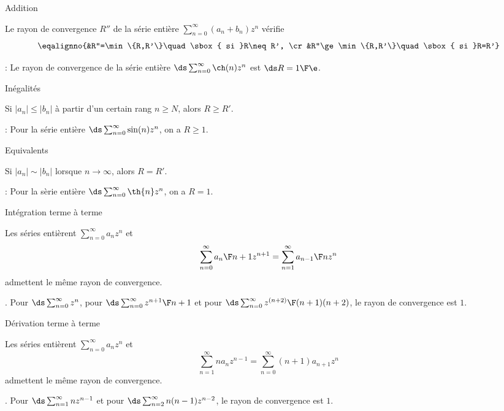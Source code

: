 \Concept [Index=Rayon de convergence!Addition] Addition

\Propriete [$R$ et $R'$ rayons de convergences de $\sum_{n=0}^\infty a_nz^n$ et $\sum_{n=0}^\infty b_nz^n$]
Le rayon de convergence $R''$ de la série entière $\sum_{n=0}^\infty(a_n+b_n)z^n$ vérifie 
$$
\eqalignno{&R''=\min\{R,R'\}\quad\sbox{ si }R\neq R', \cr
&R''\ge\min\{R,R'\}\quad\sbox{ si }R=R'} 
$$

\Application : Le rayon de convergence de la série entière $\ds\sum_{n=0}^\infty\ch(n)z^n$ est $\ds R={1\F\e}$. 

\Concept [Index=Rayon de convergence!Inegalites@Inégalités] Inégalités

\Propriete [$R$ et $R'$ rayons de convergences de $\sum_{n=0}^\infty a_nz^n$ et $\sum_{n=0}^\infty b_nz^n$]
Si $|a_n|\le |b_n|$ à partir d'un certain rang $n\ge N$, alors $R\ge R'$. 

\Application : Pour la série entière $\ds\sum_{n=0}^\infty\sin(n) z^n$, on a $R\ge 1$. 

\Concept [Index=Rayon de convergence!Equivalents] Equivalents

\Propriete [$R$ et $R'$ rayons de convergences de $\sum_{n=0}^\infty a_nz^n$ et $\sum_{n=0}^\infty b_nz^n$]
Si $|a_n|\sim|b_n|$ lorsque $n\to\infty$, alors $R=R'$. 

\Application : Pour la sèrie entière $\ds\sum_{n=0}^\infty\th{n}z^n$, on a $R=1$. 

\Concept [Index=Rayon de convergence!Integration terme a terme] Intégration terme à terme

Les séries entièrent $\sum_{n=0}^\infty a_nz^n$ et 
$$
\sum\limits_{n=0}^\infty {a_n\F n+1}z^{n+1}=\sum_{n=1}^\infty{a_{n-1}\F n}z^n
$$
admettent le même rayon de convergence. 

\Exemple. Pour $\ds\sum_{n=0}^\infty z^n$, pour $\ds\sum_{n=0}^\infty{z^{n+1}\F n+1}$ et pour 
$\ds\sum_{n=0}^\infty{z^{(n+2)}\F (n+1)(n+2)}$, le rayon de convergence est $1$. 

\Concept [Index=Rayon de convergence!Derivation terme a terme@Dérivation terme à terme] Dérivation terme à terme

Les séries entièrent $\sum_{n=0}^\infty a_nz^n$ et 
$$
\sum\limits_{n=1}^\infty na_nz^{n-1}=\sum\limits_{n=0}^\infty(n+1)a_{n+1}z^n
$$ 
admettent le même rayon de convergence. 

\Exemple. Pour $\ds \sum_{n=1}^\infty nz^{n-1}$ et pour $\ds \sum_{n=2}^\infty n(n-1)z^{n-2}$, 
le rayon de convergence est $1$. 


